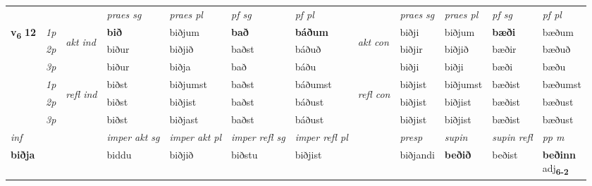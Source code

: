 \begin{longtable}[l]{X>{\footnotesize\itshape}llXXXXlXXXX}
 & &   & \textit{praes sg}  & \textit{praes pl}    & \textit{ pf sg} & \textit{pf pl} & & \textit{praes sg}  & \textit{praes pl}    & \textit{pf sg} & \textit{pf pl }  \\ \cmidrule{4-7} \cmidrule{9-12}
 \multirow{2}{*}{{{\textbf{v{\textsubscript{6}}} \Large{\textbf{12}}}}}  & 1p & \multirow{3}{*}{\begin{turn}{90}\textit{akt ind}\end{turn}} & \textbf{bið} & biðjum & \textbf{bað} & \textbf{báðum} & \multirow{3}{*}{\begin{turn}{90}\textit{akt con}\end{turn}} &biðji & biðjum & \textbf{bæði} & bæðum\\*
 & 2p &  &  biður  & biðjið & baðst & báðuð & & biðjir & biðjið & bæðir & bæðuð \\*
 & 3p &  & biður & biðja & bað & báðu & & biðji & biðji& bæði & bæðu \\*
\cmidrule{4-7} \cmidrule{9-12}
 & 1p & \multirow{3}{*}{\begin{turn}{90}\textit{refl ind}\end{turn}}  & biðst & biðjumst & baðst & báðumst & \multirow{3}{*}{\begin{turn}{90}\textit{refl con}\end{turn}}  &biðjist & biðjumst & bæðist & bæðumst \\*
 & 2p &  & biðst & biðjist & baðst & báðust & &biðjist & biðjist & bæðist & bæðust \\*
 & 3p  & & biðst & biðjast & baðst & báðust & & biðjist & biðjist& bæðist & bæðust \\*
\cmidrule{4-7} \cmidrule{9-12}

   {\textit{inf}} & &  & \textit{imper akt sg} & \textit{imper akt pl} & \textit{imper refl sg} & \textit{imper refl pl} && \textit{presp} & \textit{supin} & \textit{supin refl} & \textit{pp m} \\*
  {\textbf{biðja}} & && biddu  & biðjið & biðstu & biðjist && biðjandi &  \textbf{beðið} & beðist & \specialcell{\textbf{beðinn} \\ adj\textbf{\textsubscript{6-2}}} \\*

\midrule


\end{longtable}
